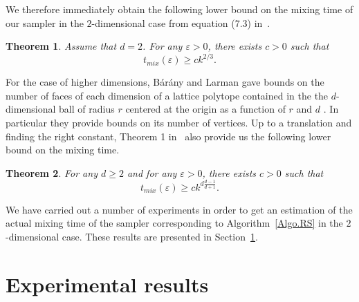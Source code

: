 \documentclass[a4paper,10pt]{article}
\newtheorem{theorem}{Theorem}
\begin{document}
We therefore immediately obtain the following lower bound on the mixing time of our sampler in the $2$-dimensional case from equation (7.3) in~\cite{levin2009markov}.

\begin{theorem}\label{Thm.Lowerbound}
Assume that $d=2$. For any $\varepsilon>0$, there exists $c>0$ such that
$$
t_{mix}(\varepsilon)\geq{ck^{2/3}}\mbox{.}
$$
\end{theorem}

For the case of higher dimensions,  B{\'a}r{\'a}ny and Larman gave bounds on the number of faces of each dimension of a lattice polytope contained in the the $d$-dimensional ball of radius $r$ centered at the origin as a function of $r$ and $d$ \cite{barany1998convex}. In particular they provide bounds on its number of vertices. Up to a translation and finding the right constant, Theorem 1 in~\cite{barany1998convex} also provide us the following lower bound on the mixing time.

\begin{theorem}
  For any $d\geq 2$ and for any $\varepsilon>0$, there exists $c>0$ such that
  $$
  t_{mix}(\varepsilon)\geq ck^{d \frac{d-1}{d+1}}\mbox{.}
  $$
\end{theorem}

We have carried out a number of experiments in order to get an estimation of the actual mixing time of the sampler corresponding to Algorithm~\ref{Algo.RS} in the $2$-dimensional case. These results are presented in Section~\ref{Sec.Res}.

\section{Experimental results}\label{Sec.Res}
\end{document}
